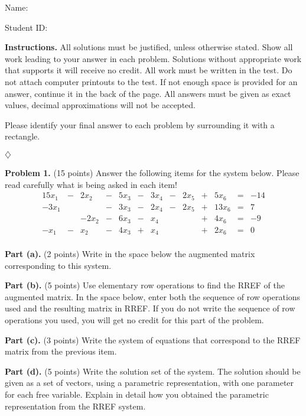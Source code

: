 \documentclass[12pt]{article}
\begin{document}
Name: \hrulefill

\bigskip
Student ID: \hrulefill

\bigskip
\textbf{Instructions.} All solutions must be justified, unless otherwise stated. Show all work leading to your answer in each problem. Solutions without appropriate work that supports it will receive no credit. All work must be written in the test. Do not attach computer printouts to the test. If not enough space is provided for an answer, continue it in the back of the page. All answers must be given as exact values, decimal approximations will not be accepted.

Please identify your final answer to each problem by surrounding it with a rectangle.

\vfill
\hfill$\diamondsuit$

\clearpage

\textbf{Problem 1.} (15 points)
Answer the following items for the system below. Please read carefully what is being asked in each item!
\begin{alignat*}{15}
x_{1} &{}-{}& 2 x_{2} &{}-{}& 5 x_{3} &{}-{}& 3 x_{4} &{}-{}& 2 x_{5} &{}+{}& 5 x_{6} &{}={}&-14\\ 
- 3 x_{1}&{}{}& &{}-{}& 3 x_{3} &{}-{}& 2 x_{4} &{}-{}& 2 x_{5} &{}+{}& 13 x_{6} &{}={}&7\\ 
&{}{}&- 2 x_{2} &{}-{}& 6 x_{3} &{}-{}& x_{4}&{}{}& &{}+{}& 4 x_{6} &{}={}&-9\\ 
- x_{1} &{}-{}& x_{2} &{}-{}& 4 x_{3} &{}+{}& x_{4}&{}{}& &{}+{}& 2 x_{6} &{}={}&0\\ 
\end{alignat*}

\textbf{Part (a).} (2 points) Write in the space below the augmented matrix corresponding to this system.

\vskip1.5in

\textbf{Part (b).} (5 points) Use elementary row operations to find the RREF of the augmented matrix. In the space below, enter both the sequence of row operations used and the resulting matrix in RREF. If you do not write the sequence of row operations you used, you will get no credit for this part of the problem.

\clearpage

\textbf{Part (c).} (3 points) Write the system of equations that correspond to the RREF matrix from the previous item.

\vskip2in

\textbf{Part (d).} (5 points) Write the solution set of the system. The solution should be given as a set of vectors, using a parametric representation, with one parameter for each free variable. Explain in detail how you obtained the parametric representation from the RREF system.
\end{document}
